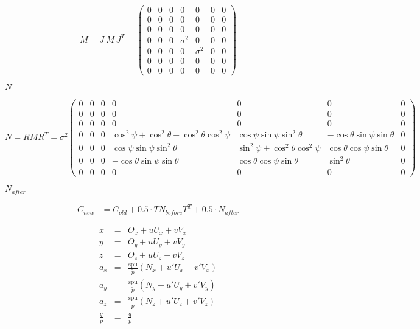 \documentclass{article}
\begin{document}
\[ \overline{M}=J\: M\: J^{T}=\left(\begin{array}{ccccccc} 0 & 0 & 0 & 0 & 0 & 0 & 0\\ 0 & 0 & 0 & 0 & 0 & 0 & 0\\ 0 & 0 & 0 & 0 & 0 & 0 & 0\\ 0 & 0 & 0 & \sigma^{2} & 0 & 0 & 0\\ 0 & 0 & 0 & 0 & \sigma^{2} & 0 & 0\\ 0 & 0 & 0 & 0 & 0 & 0 & 0\\ 0 & 0 & 0 & 0 & 0 & 0 & 0\end{array}\right)\]
\pagebreak

$N$
\pagebreak

\[ N=R\overline{M}R^{T}=\sigma^{2}\left(\begin{array}{ccccccc} 0 & 0 & 0 & 0 & 0 & 0 & 0\\ 0 & 0 & 0 & 0 & 0 & 0 & 0\\ 0 & 0 & 0 & 0 & 0 & 0 & 0\\ 0 & 0 & 0 & \cos^{2}\psi+\cos^{2}\theta-\cos^{2}\theta\cos^{2}\psi & \cos\psi\sin\psi\sin^{2}\theta & -\cos\theta\sin\psi\sin\theta & 0\\ 0 & 0 & 0 & \cos\psi\sin\psi\sin^{2}\theta & \sin^{2}\psi+\cos^{2}\theta\cos^{2}\psi & \cos\theta\cos\psi\sin\theta & 0\\ 0 & 0 & 0 & -\cos\theta\sin\psi\sin\theta & \cos\theta\cos\psi\sin\theta & \sin^{2}\theta & 0\\ 0 & 0 & 0 & 0 & 0 & 0 & 0\end{array}\right)\]
\pagebreak

$N_{after}$
\pagebreak

\begin{eqnarray*} C_{new} & = C_{old} + 0.5 \cdot T N_{before} T^{T} + 0.5 \cdot N_{after} \end{eqnarray*}
\pagebreak

\begin{eqnarray*}x & = & O_{x}+uU_{x}+vV_{x}\\y & = & O_{y}+uU_{y}+vV_{y}\\z & = & O_{z}+uU_{z}+vV_{z}\\a_{x} & = & \frac{\mbox{spu}}{\widetilde{p}}\left(N_{x}+u\prime U_{x}+v\prime V_{x}\right)\\a_{y} & = & \frac{\mbox{spu}}{\widetilde{p}}\left(N_{y}+u\prime U_{y}+v\prime V_{y}\right)\\a_{z} & = & \frac{\mbox{spu}}{\widetilde{p}}\left(N_{z}+u\prime U_{z}+v\prime V_{z}\right)\\\frac{q}{p} & = & \frac{q}{p}\end{eqnarray*}
\pagebreak
\end{document}
